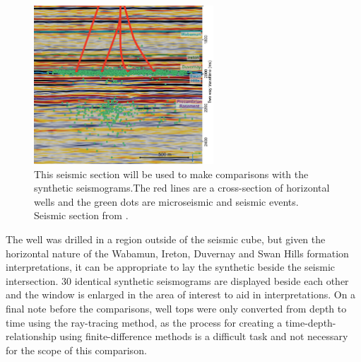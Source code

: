 \documentclass[12pt]{article}
\begin{document}
\begin{figure}[!htb]
	\centering
	\includegraphics[width=0.6\textwidth]{Figures/FCseis.jpg}
	\caption[Fox Creek interpreted seismic section]{This seismic section will be used to make comparisons with the synthetic seismograms.The red lines are a cross-section of horizontal wells and the green dots are microseismic and seismic events.  Seismic section from \cite{german2018}. }
	\label{fig:FCseis}
\end{figure}
	
	The well was drilled in a region outside of the seismic cube, but given the horizontal nature of the Wabamun, Ireton, Duvernay and Swan Hills formation interpretations, it can be appropriate to lay the synthetic beside the seismic intersection. 30 identical synthetic seismograms are displayed beside each other and the window is enlarged in the area of interest to aid in interpretations. On a final note before the comparisons, well tops were only converted from depth to time using the ray-tracing method, as the process for creating a time-depth-relationship using finite-difference methods is a difficult task and not necessary for the scope of this comparison.
	
\end{document}
